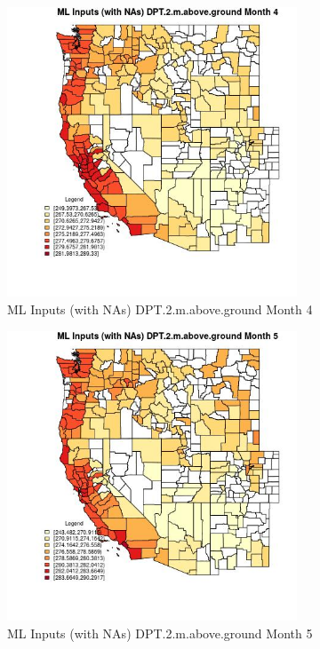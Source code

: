 \begin{figure} 
\centering  
\includegraphics[width=0.77\textwidth]{Code_Outputs/Report_ML_input_PM25_Step4_part_f_de_duplicated_aveswNAs_CountyDPT2mabovegroundmedianMonth4.jpg} 
\caption{\label{fig:Report_ML_input_PM25_Step4_part_f_de_duplicated_aveswNAsCountyDPT2mabovegroundmedianMonth4}ML Inputs (with NAs) DPT.2.m.above.ground Month 4} 
\end{figure} 
 

\begin{figure} 
\centering  
\includegraphics[width=0.77\textwidth]{Code_Outputs/Report_ML_input_PM25_Step4_part_f_de_duplicated_aveswNAs_CountyDPT2mabovegroundmedianMonth5.jpg} 
\caption{\label{fig:Report_ML_input_PM25_Step4_part_f_de_duplicated_aveswNAsCountyDPT2mabovegroundmedianMonth5}ML Inputs (with NAs) DPT.2.m.above.ground Month 5} 
\end{figure} 
 

